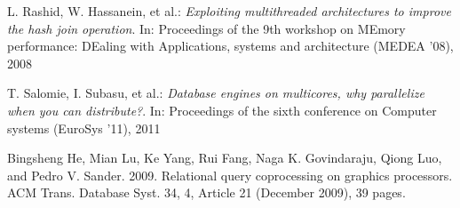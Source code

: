 \begin{thebibliography}{-----------}
 L. Rashid, W. Hassanein, et al.: {\textit{Exploiting multithreaded architectures to improve the hash join operation}}. In: Proceedings of the 9th workshop on MEmory performance: DEaling with Applications, systems and architecture (MEDEA '08), 2008

 T. Salomie, I. Subasu, et al.: {\textit{Database engines on multicores, why parallelize when you can distribute?}}. In: Proceedings of the sixth conference on Computer systems (EuroSys '11), 2011
 
\end{thebibliography}

Bingsheng He, Mian Lu, Ke Yang, Rui Fang, Naga K. Govindaraju, Qiong Luo, and Pedro V. Sander. 2009. Relational query coprocessing on graphics processors. ACM Trans. Database Syst. 34, 4, Article 21 (December 2009), 39 pages.